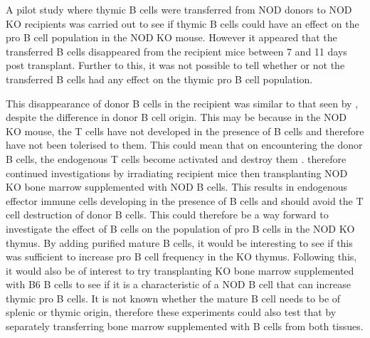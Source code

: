 A pilot study where thymic B cells were transferred from NOD donors to NOD KO recipients was carried out to see if thymic B cells could have an effect on the pro B cell population in the NOD KO mouse.
However it appeared that the transferred B cells disappeared from the recipient mice between 7 and 11 days post transplant.
Further to this, it was not possible to tell whether or not the transferred B cells had any effect on the thymic pro B cell population.

This disappearance of donor B cells in the recipient was similar to that seen by \citet{Serreze1998}, despite the difference in donor B cell origin.
This may be because in the NOD KO mouse, the T cells have not developed in the presence of B cells and therefore have not been tolerised to them.
This could mean that on encountering the donor B cells, the endogenous T cells become activated and destroy them \citep{Serreze1998}.
\citet{Serreze1998} therefore continued investigations by irradiating recipient mice then transplanting NOD KO bone marrow supplemented with NOD B cells.
This results in endogenous effector immune cells developing in the presence of B cells and should avoid the T cell destruction of donor B cells.
This could therefore be a way forward to investigate the effect of B cells on the population of pro B cells in the NOD KO thymus.
By adding purified mature B cells, it would be interesting to see if this was sufficient to increase pro B cell frequency in the KO thymus.
Following this, it would also be of interest to try transplanting KO bone marrow supplemented with B6 B cells to see if it is a characteristic of a NOD B cell that can increase thymic pro B cells.
It is not known whether the mature B cell needs to be of splenic or thymic origin, therefore these experiments could also test that by separately transferring bone marrow supplemented with B cells from both tissues.



